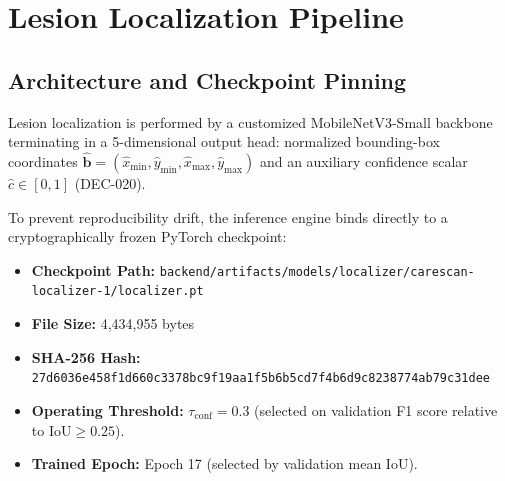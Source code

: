 \documentclass[11pt,a4paper]{report}
\newcommand{\artifact}[1]{\texttt{\footnotesize #1}}
\begin{document}
\chapter{Lesion Localization Pipeline}

\section{Architecture and Checkpoint Pinning}
Lesion localization is performed by a customized MobileNetV3-Small backbone terminating in a 5-dimensional output head: normalized bounding-box coordinates $\hat{\mathbf{b}} = (\hat{x}_\text{min}, \hat{y}_\text{min}, \hat{x}_\text{max}, \hat{y}_\text{max})$ and an auxiliary confidence scalar $\hat{c} \in [0, 1]$ (DEC-020). 

To prevent reproducibility drift, the inference engine binds directly to a cryptographically frozen PyTorch checkpoint:
\begin{itemize}
  \item \textbf{Checkpoint Path:} \artifact{backend/artifacts/models/localizer/carescan-localizer-1/localizer.pt}
  \item \textbf{File Size:} 4,434,955 bytes
  \item \textbf{SHA-256 Hash:} \texttt{27d6036e458f1d660c3378bc9f19aa1f5b6b5cd7f4b6d9c8238774ab79c31dee}
  \item \textbf{Operating Threshold:} $\tau_\text{conf} = 0.3$ (selected on validation F1 score relative to $\text{IoU} \ge 0.25$).
  \item \textbf{Trained Epoch:} Epoch 17 (selected by validation mean IoU).
\end{itemize}
\end{document}

